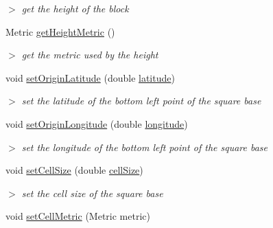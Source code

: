 \begin{DoxyCompactItemize}
\begin{DoxyCompactList}\small\item\em $>$ get the height of the block \end{DoxyCompactList}\item 
\hypertarget{classBaseBlock_a5dd47c725e6c372ec00814c87be5585c}{\-Metric \hyperlink{classBaseBlock_a5dd47c725e6c372ec00814c87be5585c}{get\-Height\-Metric} ()}\label{classBaseBlock_a5dd47c725e6c372ec00814c87be5585c}

\begin{DoxyCompactList}\small\item\em $>$ get the metric used by the height \end{DoxyCompactList}\item 
\hypertarget{classBaseBlock_ab81e8b76feb1589ab0876e7a82d65a03}{void \hyperlink{classBaseBlock_ab81e8b76feb1589ab0876e7a82d65a03}{set\-Origin\-Latitude} (double \hyperlink{classBaseBlock_ac403932018af3cc6a113a9591709ed01}{latitude})}\label{classBaseBlock_ab81e8b76feb1589ab0876e7a82d65a03}

\begin{DoxyCompactList}\small\item\em $>$ set the latitude of the bottom left point of the square base \end{DoxyCompactList}\item 
\hypertarget{classBaseBlock_a0184e3a781eabac1fe85217f68ec77ba}{void \hyperlink{classBaseBlock_a0184e3a781eabac1fe85217f68ec77ba}{set\-Origin\-Longitude} (double \hyperlink{classBaseBlock_a27fbc0dbe7f9cd0e482d8f146765ec96}{longitude})}\label{classBaseBlock_a0184e3a781eabac1fe85217f68ec77ba}

\begin{DoxyCompactList}\small\item\em $>$ set the longitude of the bottom left point of the square base \end{DoxyCompactList}\item 
\hypertarget{classBaseBlock_a89ffab6db1c194279e8564899a4ea730}{void \hyperlink{classBaseBlock_a89ffab6db1c194279e8564899a4ea730}{set\-Cell\-Size} (double \hyperlink{classBaseBlock_a1b9c700752eac2b075004711e8534735}{cell\-Size})}\label{classBaseBlock_a89ffab6db1c194279e8564899a4ea730}

\begin{DoxyCompactList}\small\item\em $>$ set the cell size of the square base \end{DoxyCompactList}\item 
\hypertarget{classBaseBlock_a87b89d085f9abcc3aeca09f59a076b23}{void \hyperlink{classBaseBlock_a87b89d085f9abcc3aeca09f59a076b23}{set\-Cell\-Metric} (\-Metric metric)}\label{classBaseBlock_a87b89d085f9abcc3aeca09f59a076b23}


\end{DoxyCompactItemize}
